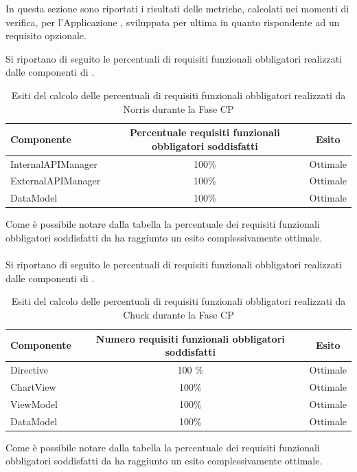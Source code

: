 In questa sezione sono riportati i risultati delle metriche, calcolati nei momenti di verifica, per l'Applicazione , sviluppata per ultima in quanto rispondente ad un requisito opzionale.


Si riportano di seguito le percentuali di requisiti funzionali obbligatori realizzati dalle componenti di .
\begin{table}[H]
	\centering
		\begin{tabu}{| l | c | c |}
			\hline
			Componente	& Percentuale requisiti funzionali obbligatori soddisfatti	& Esito		\\ \hline \hline
			InternalAPIManager	& 100\% 	& Ottimale  \\ \hline
			ExternalAPIManager  & 	100\%	& Ottimale  \\ \hline
			DataModel  & 	100\%	& Ottimale  \\ \hline
		\end{tabu}
	\caption{Esiti del calcolo delle percentuali di requisiti funzionali obbligatori realizzati da Norris durante la Fase CP}
\end{table}
Come è possibile notare dalla tabella la percentuale dei requisiti funzionali obbligatori soddisfatti da  ha raggiunto un esito complessivamente ottimale. 
\\ \\
Si riportano di seguito le percentuali di requisiti funzionali obbligatori realizzati dalle componenti di .
\begin{table}[H]
	\centering
		\begin{tabu}{| l | c | c |}
			\hline
			Componente	& Numero requisiti funzionali obbligatori soddisfatti	& Esito		\\ \hline \hline
			Directive	& 100 \% 	& Ottimale  \\ \hline
			ChartView  & 	100\%	& Ottimale  \\ \hline
			ViewModel  & 	100\%	& Ottimale  \\ \hline
			DataModel  & 	100\%	& Ottimale  \\ \hline
		\end{tabu}
	\caption{Esiti del calcolo delle percentuali di requisiti funzionali obbligatori realizzati da Chuck durante la Fase CP}
\end{table}
Come è possibile notare dalla tabella la percentuale dei requisiti funzionali obbligatori soddisfatti da  ha raggiunto un esito complessivamente ottimale.

